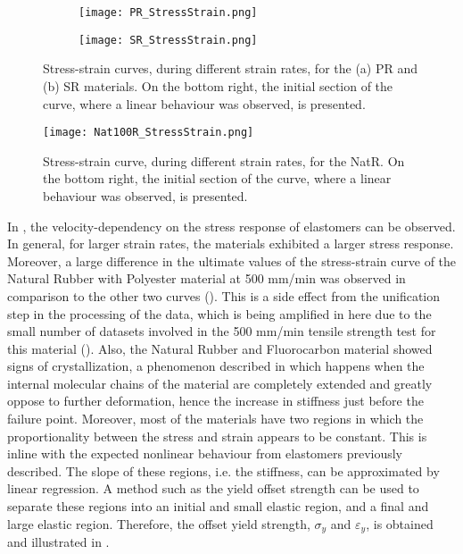 \newpage
\begin{figure}[H]
    \vspace{-2em}
    \centering
    \begin{subfigure}[b]{0.93\textwidth}
    \centering
    \texttt{[image: PR\_StressStrain.png]}
    \caption{}
    \label{fig:PRSS}
    \end{subfigure}

    \begin{subfigure}[b]{0.93\textwidth}
    \centering
    \texttt{[image: SR\_StressStrain.png]}
    \caption{}
    \label{fig:SRSS}
    \end{subfigure}
    \caption{Stress-strain curves, during different strain rates, for the (a) PR and (b) SR materials. On the bottom right, the initial section of the curve, where a linear behaviour was observed, is presented.}
    \label{fig:PR-SRSS}
\end{figure}
\newpage
\begin{figure}[H]
    \vspace*{-2em}
    \centering
    \texttt{[image: Nat100R\_StressStrain.png]}
    \caption{Stress-strain curve, during different strain rates, for the NatR. On the bottom right, the initial section of the curve, where a linear behaviour was observed, is presented.}
    \label{fig:Nat100RSS}
\end{figure}
\vspace*{-1em}
In , the velocity-dependency on the stress response of elastomers can be observed. In general, for larger strain rates, the materials exhibited a larger stress response. Moreover, a large difference in the ultimate values of the stress-strain curve of the Natural Rubber with Polyester material at 500 mm/min was observed in comparison to the other two curves (). This is a side effect from the unification step in the processing of the data, which is being amplified in here due to the small number of datasets involved in the 500 mm/min tensile strength test for this material (). Also, the Natural Rubber and Fluorocarbon material showed signs of crystallization, a phenomenon described in \cite{Bauman2008} which happens when the internal molecular chains of the material are completely extended and greatly oppose to further deformation, hence the increase in stiffness just before the failure point. Moreover, most of the materials have two regions in which the proportionality between the stress and strain appears to be constant. This is inline with the expected nonlinear behaviour from elastomers previously described. The slope of these regions, i.e. the stiffness, can be approximated by linear regression. A method such as the yield offset strength can be used to separate these regions into an initial and small elastic region, and a final and large elastic region. Therefore, the offset yield strength, $\sigma_y$ and $\varepsilon_y$, is obtained and illustrated in .

